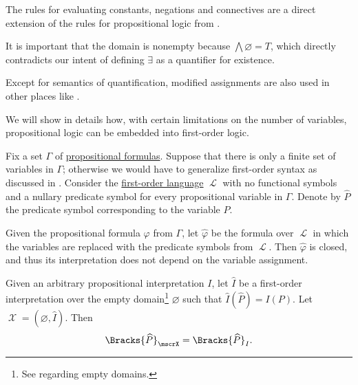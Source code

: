 \begin{comments}
  \item The rules for evaluating constants, negations and connectives are a direct extension of the rules for propositional logic from .

  \item It is important that the domain is nonempty because \( \bigwedge\varnothing = T \), which directly contradicts our intent of defining \( \exists \) as a quantifier for existence.

  \item Except for semantics of quantification, modified assignments are also used in other places like .
\end{comments}

\begin{remark}\label{rem:propositional_logic_as_first_order_logic}
  We will show in details how, with certain limitations on the number of variables, propositional logic can be embedded into first-order logic.

  Fix a set \( \Gamma \) of \hyperref[def:propositional_syntax/formula]{propositional formulas}. Suppose that there is only a finite set of variables in \( \Gamma \); otherwise we would have to generalize first-order syntax as discussed in . Consider the \hyperref[def:first_order_syntax]{first-order language} \( \mscrL \) with no functional symbols and a nullary predicate symbol for every propositional variable in \( \Gamma \). Denote by \( \widehat{P} \) the predicate symbol corresponding to the variable \( P \).

  Given the propositional formula \( \varphi \) from \( \Gamma \), let \( \widehat \varphi \) be the formula over \( \mscrL \) in which the variables are replaced with the predicate symbols from \( \mscrL \). Then \( \widehat \varphi \) is closed, and thus its interpretation does not depend on the variable assignment.

  Given an arbitrary propositional interpretation \( I \), let \( \widehat{I} \) be a first-order interpretation over the empty domain\footnote{See  regarding empty domains.} \( \varnothing \) such that \( \widehat{I}(\widehat{P}) = I(P) \). Let \( \mscrX = (\varnothing, \widehat{I}) \). Then
  \begin{equation*}
    \Bracks{\widehat{P}}_\mscrX = \Bracks{\widehat{P}}_I.
  \end{equation*}
\end{remark}


